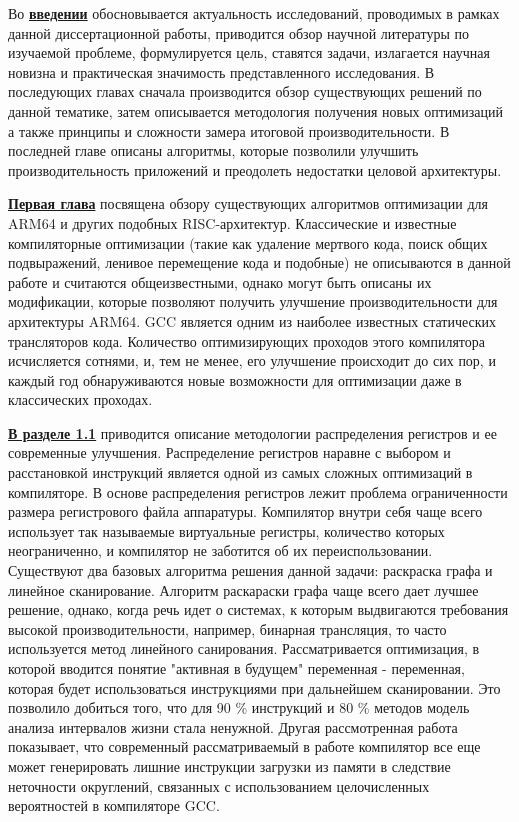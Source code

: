 Во \underline{\textbf{введении}} обосновывается актуальность исследований, проводимых в рамках данной диссертационной работы, приводится обзор научной литературы по изучаемой проблеме, формулируется цель, ставятся задачи, излагается научная новизна и практическая значимость представленного исследования. В последующих главах сначала производится обзор существующих решений по данной тематике, затем описывается методология получения новых оптимизаций а также принципы и сложности замера итоговой производительности. В последней главе описаны алгоритмы, которые позволили улучшить производительность приложений и преодолеть недостатки целовой архитектуры.


\underline{\textbf{Первая глава}} посвящена обзору существующих алгоритмов оптимизации
для ARM64 и других подобных RISC-архитектур. Классические и известные
компиляторные оптимизации (такие как удаление мертвого кода, поиск общих
подвыражений, ленивое перемещение кода и подобные) не описываются в данной работе и считаются общеизвестными, однако могут быть описаны их модификации, которые
позволяют получить улучшение производительности для архитектуры ARM64.
GCC является одним из наиболее известных статических трансляторов
кода. Количество оптимизирующих проходов этого компилятора исчисляется
сотнями, и, тем не менее, его улучшение происходит до сих пор, и каждый
год обнаруживаются новые возможности для оптимизации даже в классических
проходах. 




\underline{\textbf{В разделе 1.1}} приводится описание методологии распределения регистров
и ее современные улучшения. Распределение регистров наравне с выбором и расстановкой инструкций
является одной из самых сложных оптимизаций в компиляторе. В  основе распределения регистров лежит проблема ограниченности размера
регистрового файла аппаратуры. Компилятор внутри себя чаще всего
использует так называемые виртуальные регистры, количество которых неограниченно,
и компилятор не заботится об их переиспользовании. Существуют два базовых алгоритма решения данной задачи: раскраска графа и линейное сканирование. Алгоритм раскараски графа чаще всего дает лучшее решение, однако, когда речь идет о системах, к которым выдвигаются требования
высокой производительности, например, бинарная трансляция, то часто используется
метод линейного санирования. Рассматривается  оптимизация, в которой вводится понятие "активная в
будущем" переменная - переменная, которая будет использоваться инструкциями
при дальнейшем сканировании. Это позволило добиться того, что для 90 \%
инструкций и 80 \% методов модель анализа интервалов жизни стала ненужной. Другая рассмотренная работа показывает, что современный рассматриваемый в работе компилятор все еще может генерировать лишние инструкции загрузки из памяти в
следствие неточности округлений, связанных с использованием целочисленных
вероятностей в компиляторе GCC.

